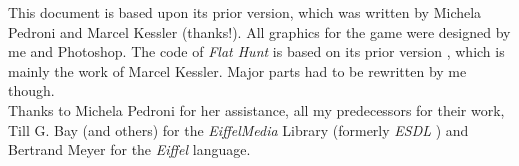 This document is based upon its prior version, which was written by Michela Pedroni and Marcel Kessler (thanks!). All graphics for the game were designed by me and Photoshop. The code of \emph{Flat Hunt} is based on its prior version \cite{mk04}, which is mainly the work of Marcel Kessler. Major parts had to be rewritten by me though.\\

Thanks to Michela Pedroni for her assistance, all my predecessors for their work, Till G. Bay (and others) for the \emph{EiffelMedia} Library (formerly \emph{ESDL} \cite{tgb03}\cite{bb04}) and Bertrand Meyer for the \emph{Eiffel} language. 

